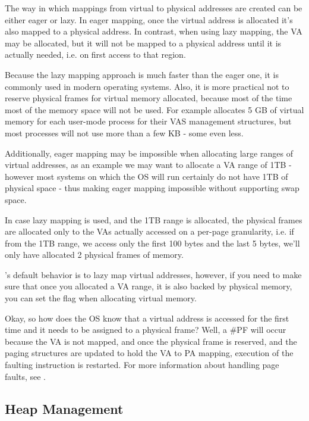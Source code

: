 \begin{appendices}
The way in which mappings from virtual to physical addresses are created can be either eager or lazy.
In eager mapping, once the virtual address is allocated it's also mapped to a physical address. In
contrast, when using lazy mapping, the VA may be allocated, but it will not be mapped to a physical
address until it is actually needed, i.e. on first access to that region.

Because the lazy mapping approach is much faster than the eager one, it is commonly used in modern
operating systems. Also, it is more practical not to reserve physical frames for virtual memory
allocated, because most of the time most of the memory space will not be used. For example
\projectname allocates 5 GB of virtual memory for each user-mode process for their VAS management
structures, but most processes will not use more than a few KB - some even less.

Additionally, eager mapping may be impossible when allocating large ranges of virtual
addresses, as an example we may want to allocate a VA range of 1TB - however most systems on which
the OS will run certainly do not have 1TB of physical space - thus making eager mapping impossible
without supporting swap space.

In case lazy mapping is used, and the 1TB range is allocated, the physical frames are allocated only
to the VAs actually accessed on a per-page granularity, i.e. if from the 1TB range, we access only
the first 100 bytes and the last 5 bytes, we'll only have allocated 2 physical frames of memory.

\projectname's default behavior is to lazy map virtual addresses, however, if you need to make sure
that once you allocated a VA range, it is also backed by physical memory, you can set the
 flag when allocating virtual memory.

Okay, so how does the OS know that a virtual address is accessed for the first time and it needs to
be assigned to a physical frame? Well, a \#PF will occur because the VA is not mapped, and once the
physical frame is reserved, and the paging structures are updated to hold the VA to PA mapping,
execution of the faulting instruction is restarted. For more information about handling page faults,
see .

\subsection{Heap Management}


\end{appendices}
